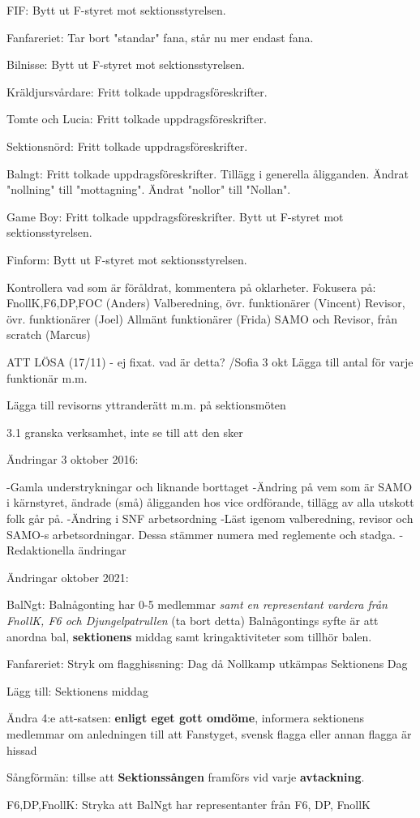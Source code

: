 FIF:
Bytt ut F-styret mot sektionsstyrelsen.

Fanfareriet:
Tar bort "standar" fana, står nu mer endast fana.

Bilnisse:
Bytt ut F-styret mot sektionsstyrelsen.

Kräldjursvårdare:
Fritt tolkade uppdragsföreskrifter.

Tomte och Lucia:
Fritt tolkade uppdragsföreskrifter.

Sektionsnörd:
Fritt tolkade uppdragsföreskrifter.

Balngt:
Fritt tolkade uppdragsföreskrifter.
Tillägg i generella åligganden.
Ändrat "nollning" till "mottagning".
Ändrat "nollor" till "Nollan".

Game Boy:
Fritt tolkade uppdragsföreskrifter.
Bytt ut F-styret mot sektionsstyrelsen.

Finform:
Bytt ut F-styret mot sektionsstyrelsen.

Kontrollera vad som är föråldrat, kommentera på oklarheter.
Fokusera på:
FnollK,F6,DP,FOC (Anders)
Valberedning, övr. funktionärer (Vincent)
Revisor, övr. funktionärer (Joel)
Allmänt funktionärer (Frida)
SAMO och Revisor, från scratch (Marcus)



ATT LÖSA (17/11)  - ej fixat. vad är detta? /Sofia 3 okt
Lägga till antal för varje funktionär m.m.

Lägga till revisorns yttranderätt m.m. på sektionsmöten

3.1 granska verksamhet, inte se till att den sker


Ändringar 3 oktober 2016: 

-Gamla understrykningar och liknande borttaget
-Ändring på vem som är SAMO i kärnstyret, ändrade (små) åligganden hos vice ordförande, tillägg av alla utskott folk går på. 
-Ändring i SNF arbetsordning
-Läst igenom valberedning, revisor och SAMO-s arbetsordningar. Dessa stämmer numera med reglemente och stadga.
-Redaktionella ändringar


Ändringar oktober 2021:

BalNgt:
Balnågonting har 0-5 medlemmar \textit{samt en representant vardera från FnollK, F6 och Djungelpatrullen} (ta bort detta)
Balnågontings syfte är att anordna bal, \textbf{sektionens} middag samt kringaktiviteter som tillhör balen.

Fanfareriet:
Stryk om flagghissning:
Dag då Nollkamp utkämpas
Sektionens Dag

Lägg till:
Sektionens middag

Ändra 4:e att-satsen:
\textbf{enligt eget gott omdöme}, informera sektionens medlemmar om anledningen till att Fanstyget, svensk flagga eller annan flagga är hissad

Sångförmän:
tillse att \textbf{Sektionssången} framförs vid varje \textbf{avtackning}.

F6,DP,FnollK:
Stryka att BalNgt har representanter från F6, DP, FnollK